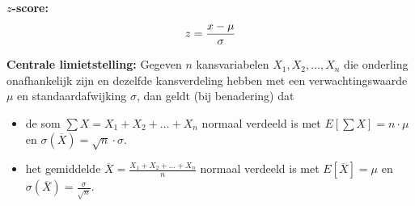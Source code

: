 
\textbf{$z$-score:}
\[
    z = \frac{x - \mu}{\sigma}\\
\]

\textbf{Centrale limietstelling:}
Gegeven $n$ kansvariabelen $X_1, X_2, \ldots, X_n$ die onderling onafhankelijk zijn en dezelfde kansverdeling hebben met een verwachtingswaarde $\mu$ en standaardafwijking $\sigma$, dan geldt (bij benadering) dat
\begin{itemize}
    \item de som $\sum X = X_1 + X_2 + \ldots + X_n$ normaal verdeeld is met $E[\sum X] = n \cdot \mu$ en $\sigma(\overline{X}) = \sqrt{n} \cdot \sigma$.
    \item het gemiddelde $\overline{X} = \frac{X_1 + X_2 + \ldots + X_n}{n}$ normaal verdeeld is met $E[\overline{X}]=\mu$ en $\sigma(\overline{X})=\frac{\sigma}{\sqrt{n}}$.
\end{itemize}

